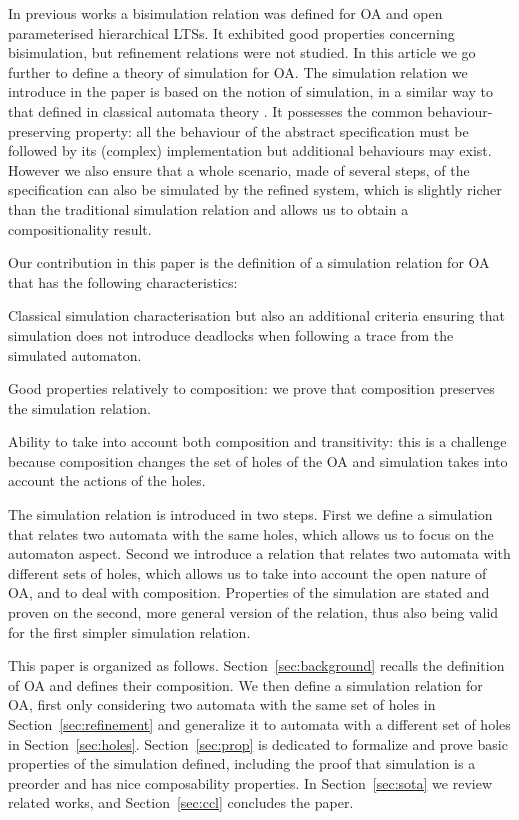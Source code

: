 \documentclass[runningheads]{llncs}
\begin{document}
In previous works \cite{AMHEEMA:2023,wang:03126313} a bisimulation relation was defined for OA and open parameterised hierarchical LTSs. It exhibited good properties concerning bisimulation, but refinement relations were not studied. In this article we go further to  define a theory of simulation for OA. The simulation relation we introduce in the paper  is based on the notion of   simulation,  in a similar way to that defined in classical automata theory \cite{Milner:1989,Bellegarde:2000}.   It possesses the common behaviour-preserving  property:  all the behaviour of the abstract specification must be followed by its (complex) implementation but additional behaviours may exist. However we also ensure that a whole scenario, made of several steps, of the specification can also be simulated by the refined system, which is slightly richer than the traditional simulation relation and  allows us to obtain a compositionality result.

Our contribution in this paper is the definition of a simulation relation for OA that has the following characteristics:
\begin{compactitem}
\item Classical simulation characterisation but also an additional criteria ensuring that simulation does not introduce deadlocks when following a trace from the simulated automaton.
\item Good properties relatively to composition: we prove that composition preserves the simulation relation.
\item Ability to take into account both composition and transitivity: this is a challenge because composition changes the set of holes of the OA and simulation takes into account the actions of the holes.
\end{compactitem}
 The simulation relation is introduced in two steps. First we define a simulation that relates two automata with the same holes, which allows us to focus on the automaton aspect. Second we introduce a relation that relates two automata with different sets of holes, which allows us to take into account the open nature of OA, and to deal with composition. Properties of the simulation are stated and proven on the second, more general version of the relation,   thus also being valid  for the first simpler simulation relation.

This paper is organized as follows. Section~\ref{sec:background} recalls the definition of OA and defines their composition. 
We  then  define a simulation relation for OA, first only considering two automata with the same set of holes in Section~\ref{sec:refinement} and generalize it to automata with a different set of holes in Section~\ref{sec:holes}.  Section~\ref{sec:prop} is dedicated to formalize and prove basic properties of the simulation defined, including the proof that simulation is a preorder and has nice composability properties. 
In Section~\ref{sec:sota} we review related works, and Section~\ref{sec:ccl} concludes the paper.
\end{document}
